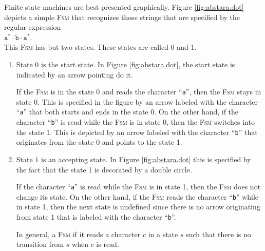 \noindent
Finite state machines are best presented graphically.  Figure \ref{fig:abstara.dot} depicts a simple
\textsc{Fsm} that recognizes those strings that are specified by the regular expression
\\[0.2cm]
\hspace*{1.3cm}
$\texttt{a}^*\cdot\texttt{b}\cdot\texttt{a}^*$.
\\[0.2cm]
This \textsc{Fsm} has but two states.  These states are called $0$ and $1$.
\begin{enumerate}
\item State $0$  is the start state.  In Figure \ref{fig:abstara.dot}, the start state is indicated by an arrow
      pointing do it.  
  
      If the \textsc{Fsm} is in the state 0 and reads the character ``\texttt{a}'', then the
      \textsc{Fsm} stays in state 0.  This is specified in the figure by an arrow labeled with the
      character ``\texttt{a}'' that both starts and ends in the state 0.  On the other hand, if the
      character ``\texttt{b}'' is read while the \textsc{Fsm} is in state 0, then the \textsc{Fsm}
      switches into the state 1.  This is depicted by an arrow labeled with the character
      ``\texttt{b}'' that originates from the state 0 and points to the state 1.
\item State  $1$ is an accepting state. In Figure \ref{fig:abstara.dot} this is specified by the
      fact that the state 1 is decorated by a double circle.

      If the character ``\texttt{a}'' is read while the \textsc{Fsm} is in state 1, then the
      \textsc{Fsm} does not change its state.  On the other hand, if the \textsc{Fsm} reads the
      character ``\texttt{b}'' while in state 1, then the next state is undefined since there is no
      arrow originating from state 1 that is labeled with the character ``\texttt{b}''.

      In general, a \textsc{Fsm}  if it reads a character $c$ in a state $s$ such that there
      is no transition from $s$ when $c$ is read.
\end{enumerate}

